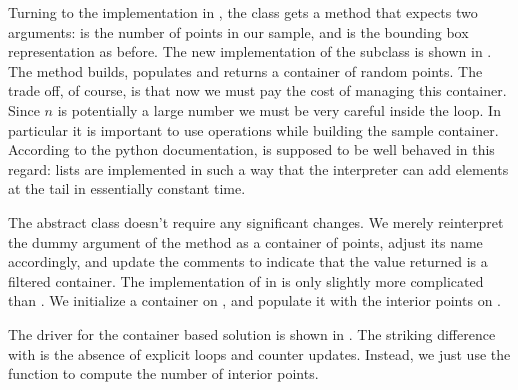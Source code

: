 Turning to the implementation in , the class
 gets a method  that expects two arguments:  is
the number of points in our sample, and  is the bounding box representation as
before.
%
%
The new implementation of the subclass  is shown in
. The method  builds, populates and returns a
container of  random points. The trade off, of course, is that now we must pay
the cost of managing this container. Since $n$ is potentially a large number we must be very
careful inside the  loop. In particular it is important to use 
operations while building the sample container. According to the python documentation,
 is supposed to be well behaved in this regard: lists are implemented in
such a way that the interpreter can add elements at the tail in essentially constant time.
%
%


The abstract class  doesn't require any significant changes. We merely reinterpret
the dummy argument  of the method  as a container of
points, adjust its name accordingly, and update the comments to indicate that the value
returned is a filtered container.
%
%
The implementation of  in  is only slightly more
complicated than . We initialize a container  on
, and populate it with the interior points on .
%
%

The driver for the container based solution is shown in .
The striking difference with  is the absence of explicit loops and
counter updates. Instead, we just use the function  to compute the number of
interior points.
%
%

